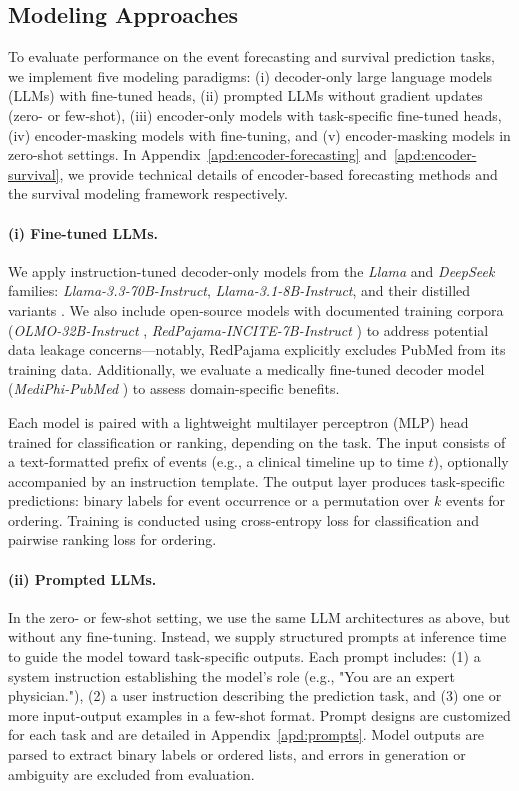 \documentclass[letterpaper]{article} %
\begin{document}
\subsection{Modeling Approaches}
To evaluate performance on the event forecasting and survival prediction tasks, we implement five modeling paradigms: (i) decoder-only large language models (LLMs) with fine-tuned heads, (ii) prompted LLMs without gradient updates (zero- or few-shot), (iii) encoder-only models with task-specific fine-tuned heads, (iv) encoder-masking models with fine-tuning, and (v) encoder-masking models in zero-shot settings. In Appendix~\ref{apd:encoder-forecasting} and~\ref{apd:encoder-survival}, we provide technical details of encoder-based forecasting methods and the survival modeling framework respectively.

\paragraph{(i) Fine-tuned LLMs.}  
We apply instruction-tuned decoder-only models from the \textit{Llama} and \textit{DeepSeek} families: \textit{Llama-3.3-70B-Instruct}, \textit{Llama-3.1-8B-Instruct}, and their distilled variants \citep{grattafiori2024llama, liu2024deepseek}. We also include open-source models with documented training corpora (\textit{OLMO-32B-Instruct} \citep{olmo20242}, \textit{RedPajama-INCITE-7B-Instruct} \citep{weber2024redpajama}) to address potential data leakage concerns---notably, RedPajama explicitly excludes PubMed from its training data. Additionally, we evaluate a medically fine-tuned decoder model (\textit{MediPhi-PubMed} \citep{corbeil2025modular}) to assess domain-specific benefits.

Each model is paired with a lightweight multilayer perceptron (MLP) head trained for classification or ranking, depending on the task. 
The input consists of a text-formatted prefix of events (e.g., a clinical timeline up to time $t$), optionally accompanied by an instruction template. 
The output layer produces task-specific predictions: binary labels for event occurrence or a permutation over $k$ events for ordering. 
Training is conducted using cross-entropy loss for classification and pairwise ranking loss for ordering.

\paragraph{(ii) Prompted LLMs.}  
In the zero- or few-shot setting, we use the same LLM architectures as above, but without any fine-tuning. 
Instead, we supply structured prompts at inference time to guide the model toward task-specific outputs. 
Each prompt includes: 
(1) a system instruction establishing the model’s role (e.g., "You are an expert physician."), 
(2) a user instruction describing the prediction task, and 
(3) one or more input-output examples in a few-shot format.
Prompt designs are customized for each task and are detailed in Appendix~\ref{apd:prompts}. Model outputs are parsed to extract binary labels or ordered lists, and errors in generation or ambiguity are excluded from evaluation.
\end{document}
